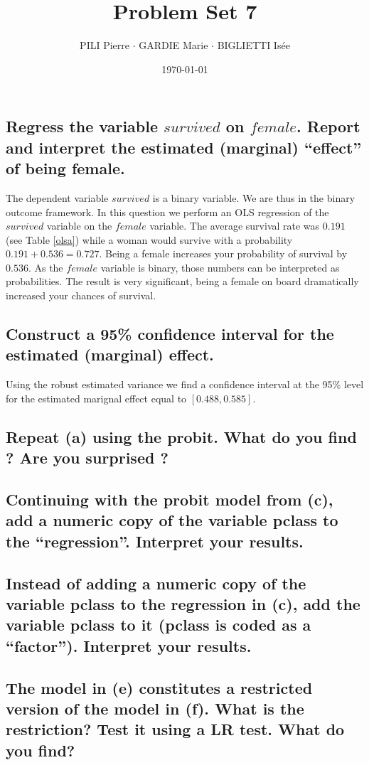 \documentclass[12pt]{article}
\title{Problem Set 7}
\author{PILI Pierre $\cdot$ GARDIE Marie $\cdot$ BIGLIETTI Isée}
\date{\today}
\renewcommand{\thesubsection}{\arabic{section}.\arabic{subsection}}
\begin{document}
\maketitle
\renewcommand{\thesubsection}{\alph{subsection}}

\subsection{Regress the variable $survived$ on $female$. Report and interpret the estimated (marginal) “effect” of being female.}

The dependent variable $survived$ is a binary variable. We are thus in the binary outcome framework. In this question we perform an OLS regression of the $survived$
variable on the $female$ variable. The average survival rate was $0.191$ (see Table \ref{olsa}) while a woman would survive with a probability $0.191 + 0.536 = 0.727$.
Being a female increases your probability of survival by $0.536$. As the $female$ variable is binary, those numbers can be interpreted as probabilities. The result is very significant, being a female on board dramatically increased your chances of survival.
\subsection{Construct a 95\% confidence interval for the estimated (marginal) effect.}
Using the robust estimated variance we find a confidence interval at the 95\% level for the estimated marignal effect equal to $[0.488, 0.585]$.
\subsection{Repeat (a) using the probit. What do you find ? Are you surprised ?}

\subsection{Continuing with the probit model from (c), add a numeric copy of the variable pclass to the “regression”. Interpret your results.}
\subsection{Instead of adding a numeric copy of the variable pclass to the regression in (c), add the variable pclass to it (pclass is coded as a “factor”). Interpret your results.}
\subsection{The model in (e) constitutes a restricted version of the model in (f). What is the restriction? Test it using a LR test. What do you find?}
\end{document}
